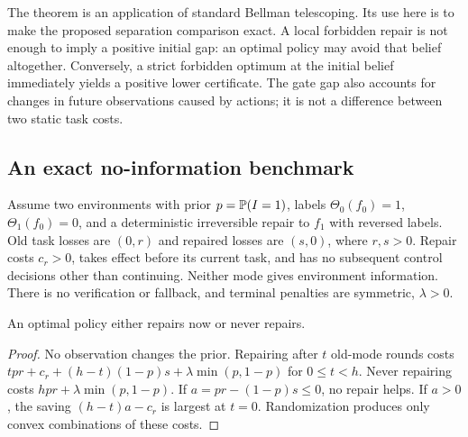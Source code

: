The theorem is an application of standard Bellman telescoping. Its use here is
to make the proposed separation comparison exact. A local forbidden repair is
not enough to imply a positive initial gap: an optimal policy may avoid that
belief altogether. Conversely, a strict forbidden optimum at the initial belief
immediately yields a positive lower certificate. The gate gap also accounts for
changes in future observations caused by actions; it is not a difference between
two static task costs.

\subsection{An exact no-information benchmark}
Assume two environments with prior $p=\mathbb P(I=1)$, labels
$\Theta_0(f_0)=1$, $\Theta_1(f_0)=0$, and a deterministic irreversible repair to
$f_1$ with reversed labels. Old task losses are $(0,r)$ and repaired losses
are $(s,0)$, where $r,s>0$. Repair costs $c_r>0$, takes effect before its current
task, and has no subsequent control decisions other than continuing. Neither
mode gives environment information. There is no verification or fallback, and
terminal penalties are symmetric, $\lambda>0$.

\begin{lemma}
\label{lem:immediate}
An optimal policy either repairs now or never repairs.
\end{lemma}
\begin{proof}
No observation changes the prior. Repairing after $t$ old-mode rounds costs
$tpr+c_r+(h-t)(1-p)s+\lambda\min(p,1-p)$ for $0\le t<h$.
Never repairing costs $hpr+\lambda\min(p,1-p)$.
If $a=pr-(1-p)s\le0$, no repair helps. If $a>0$, the saving
$(h-t)a-c_r$ is largest at $t=0$. Randomization produces only convex combinations
of these costs.
\end{proof}

